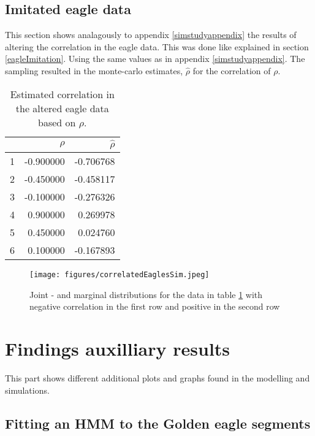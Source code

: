 \subsection{Imitated eagle data}
This section shows analagously to appendix \ref{simstudyappendix} the results of altering the correlation in the eagle data. This was done like explained in section \ref{eagleImitation}. Using the same values as in appendix \ref{simstudyappendix}. The sampling resulted in the monte-carlo estimates, $\hat{\rho}$ for the correlation of $\rho$.
\begin{table}[ht]
    \centering
    \begin{tabular}{rrr}
      \hline
     & $\rho$ & $\hat{\rho}$ \\ 
      \hline
    1 & -0.900000 & -0.706768 \\ 
      2 & -0.450000 & -0.458117 \\ 
      3 & -0.100000 & -0.276326 \\ 
      4 & 0.900000 & 0.269978 \\ 
      5 & 0.450000 & 0.024760 \\ 
      6 & 0.100000 & -0.167893 \\ 
       \hline
    \end{tabular}
    \caption{Estimated correlation in the altered eagle data based on $\rho$.}
    \label{correlatedEagleTable}
    \end{table}

    \begin{figure}[h!]
        \begin{center}
        \texttt{[image: figures/correlatedEaglesSim.jpeg]}
        \caption{Joint - and marginal distributions for the data in table \ref{correlatedEagleTable} with negative correlation in the first row and positive in the second row}
    \end{center}
    \label{correlationEagleDensities}
\end{figure}
\newpage
\section{Findings auxilliary results}\label{auxiliaryResultsModelling}
This part shows different additional plots and graphs found in the modelling and simulations. 
\subsection{Fitting an HMM to the Golden eagle segments}\label{goldenEagleSegments}
\newpage
